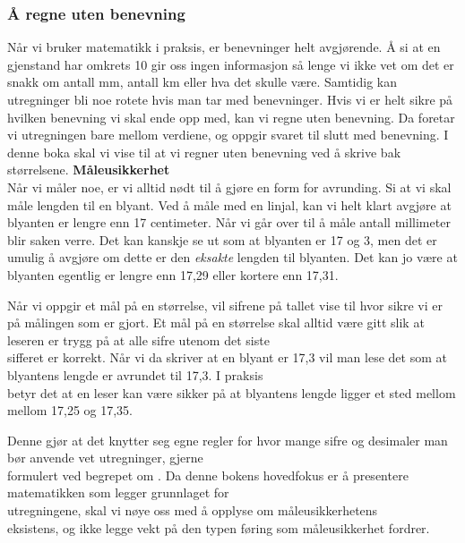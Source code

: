 \subsubsection{Å regne uten benevning} \label{nondimension}
Når vi bruker matematikk i praksis, er benevninger helt avgjørende. Å si at en gjenstand har omkrets 10 gir oss ingen informasjon så lenge vi ikke vet om det er snakk om antall mm, antall km eller hva det skulle være. Samtidig kan utregninger bli noe rotete hvis man tar med benevninger. Hvis vi er helt sikre på hvilken benevning vi skal ende opp med, kan vi regne uten benevning. Da foretar vi utregningen bare mellom verdiene, og oppgir svaret til slutt med benevning. I denne boka skal vi vise til at vi regner uten benevning ved å skrive \sym{*} bak størrelsene.
 \vspace{10pt}
\textbf{Måleusikkerhet} \\[1pt]
Når vi måler noe, er vi alltid nødt til å gjøre en form for avrunding. Si at vi skal måle lengden til en blyant. Ved å måle med en linjal, kan vi helt klart avgjøre at blyanten er lengre enn 17 centimeter. Når vi går over til å måle antall millimeter blir saken verre. Det kan kanskje se ut som at blyanten er 17 og 3, men det er umulig å avgjøre om dette er den \textsl{eksakte} lengden til blyanten. Det kan jo være at blyanten egentlig er lengre enn 17,29 eller kortere enn 17,31.\os

Når vi oppgir et mål på en størrelse, vil sifrene på tallet vise til hvor sikre vi er på målingen som er gjort. Et mål på en størrelse skal alltid være gitt slik at leseren er trygg på at alle sifre utenom det siste\\ sifferet er korrekt. Når vi da skriver at en blyant er 17,3 vil man lese det som at blyantens lengde er avrundet til 17,3. I praksis\\ betyr det at en leser kan være sikker på at blyantens lengde ligger et sted mellom mellom 17,25 og 17,35. \os

Denne  gjør at det knytter seg egne regler for hvor mange sifre og desimaler man bør anvende vet utregninger, gjerne \\ formulert ved begrepet om . Da denne bokens hovedfokus er å presentere matematikken som legger grunnlaget for\\ utregningene, skal vi nøye oss med å opplyse om måleusikkerhetens\\ eksistens, og ikke legge vekt på den typen føring som måleusikkerhet fordrer.


